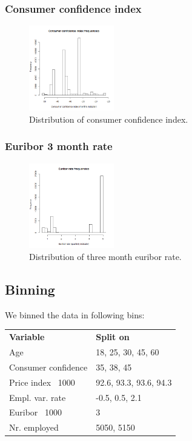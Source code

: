 \documentclass[11pt]{article}
\begin{document}
\begin{multicols}{2}
\subsubsection{Consumer confidence index}
\begin{figure}[H]
	\centering
	\includegraphics[width=0.33\textwidth]{images/consumer_confidence_index}
	\caption{Distribution of consumer confidence index.}
	\label{fig:cons_conf_idx}
\end{figure}

\subsubsection{Euribor 3 month rate}
\begin{figure}[H]
	\centering
	\includegraphics[width=0.33\textwidth]{images/euribor3m}
	\caption{Distribution of three month euribor rate.}
	\label{fig:euribor3m}
\end{figure}

\newpage
\subsection{Binning}
We binned the data in following bins:

\medskip
\begin{tabular}{ll}
	\textbf{Variable}           & \textbf{Split on} \\
	Age                         & 18, 25, 30, 45, 60 \\
	Consumer confidence         & 35, 38, 45 \\
	Price index \ 1000          & 92.6, 93.3, 93.6, 94.3 \\
	Empl. var. rate             & -0.5, 0.5, 2.1 \\
	Euribor \ 1000              & 3 \\
	Nr. employed                & 5050, 5150 \\
\end{tabular}


\end{multicols}
\end{document}
